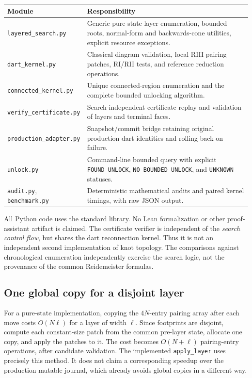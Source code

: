 \documentclass[11pt]{article}
\theoremstyle{definition}
\newcommand{\code}[1]{\texttt{#1}}
\begin{document}
\begin{center}
\begin{tabular}{>{\raggedright\arraybackslash}p{}>{\raggedright\arraybackslash}p{}}
\toprule
Module & Responsibility\\
\midrule
\code{layered\_search.py} & Generic pure-state layer enumeration, bounded roots,
normal-form and backwards-cone utilities, explicit resource exceptions.\\
\code{dart\_kernel.py} & Classical diagram validation, local RIII pairing
patches, RI/RII tests, and reference reduction operations.\\
\code{connected\_kernel.py} & Unique connected-region enumeration and the
complete bounded unlocking algorithm.\\
\code{verify\_certificate.py} & Search-independent certificate replay and
validation of layers and terminal faces.\\
\code{production\_adapter.py} & Snapshot/commit bridge retaining original
production dart identities and rolling back on failure.\\
\code{unlock.py} & Command-line bounded query with explicit
\code{FOUND\_UNLOCK}, \code{NO\_BOUNDED\_UNLOCK}, and \code{UNKNOWN} statuses.\\
\code{audit.py}, \code{benchmark.py} & Deterministic mathematical audits and
paired kernel timings, with raw JSON output.\\
\bottomrule
\end{tabular}
\end{center}

All Python code uses the standard library. No Lean formalization or other
proof-assistant artifact is claimed. The certificate verifier is independent
of the \emph{search control flow}, but shares the dart reconnection kernel.
Thus it is not an independent second implementation of knot topology.
The comparisons against chronological enumeration independently exercise
the search logic, not the provenance of the common Reidemeister formulas.

\subsection{One global copy for a disjoint layer}

For a pure-state implementation, copying the $4N$-entry pairing array after
each move costs $O(N\ell)$ for a layer of width $\ell$. Since footprints
are disjoint, compute each constant-size patch from the common pre-layer
state, allocate one copy, and apply the patches to it. The cost becomes
$O(N+\ell)$ pairing-entry operations, after candidate validation. The
implemented \code{apply\_layer} uses precisely this method. It does not
claim a corresponding speedup over the production mutable journal, which
already avoids global copies in a different way.
\end{document}
